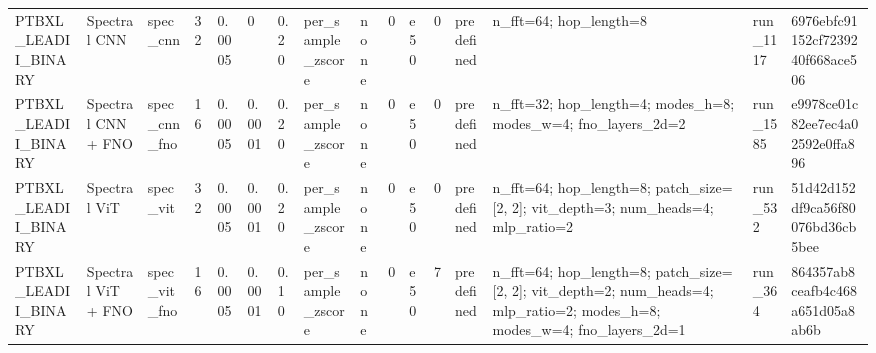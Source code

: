 \begin{table}
\begin{tabular}{llllllllllllllll}
PTBXL\_LEADII\_BINARY & Spectral CNN & spec\_cnn & 32 & 0.0005 & 0 & 0.20 & per\_sample\_zscore & none & 0 & e50 & 0 & predefined & n\_fft=64; hop\_length=8 & run\_1117 & 6976ebfc91152cf7239240f668ace506 \\
PTBXL\_LEADII\_BINARY & Spectral CNN + FNO & spec\_cnn\_fno & 16 & 0.0005 & 0.0001 & 0.20 & per\_sample\_zscore & none & 0 & e50 & 0 & predefined & n\_fft=32; hop\_length=4; modes\_h=8; modes\_w=4; fno\_layers\_2d=2 & run\_1585 & e9978ce01c82ee7ec4a02592e0ffa896 \\
PTBXL\_LEADII\_BINARY & Spectral ViT & spec\_vit & 32 & 0.0005 & 0.0001 & 0.20 & per\_sample\_zscore & none & 0 & e50 & 0 & predefined & n\_fft=64; hop\_length=8; patch\_size=[2, 2]; vit\_depth=3; num\_heads=4; mlp\_ratio=2 & run\_532 & 51d42d152df9ca56f80076bd36cb5bee \\
PTBXL\_LEADII\_BINARY & Spectral ViT + FNO & spec\_vit\_fno & 16 & 0.0005 & 0.0001 & 0.10 & per\_sample\_zscore & none & 0 & e50 & 7 & predefined & n\_fft=64; hop\_length=8; patch\_size=[2, 2]; vit\_depth=2; num\_heads=4; mlp\_ratio=2; modes\_h=8; modes\_w=4; fno\_layers\_2d=1 & run\_364 & 864357ab8ceafb4c468a651d05a8ab6b \\
\bottomrule
\end{tabular}
\end{table}

